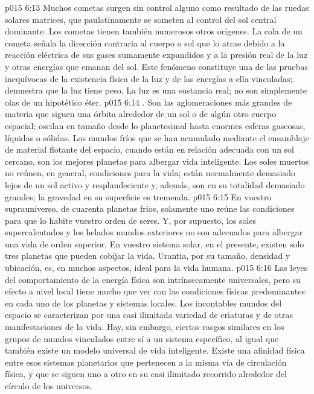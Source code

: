 \vs p015 6:13 Muchos cometas surgen sin control alguno como resultado de las ruedas solares matrices, que paulatinamente se someten al control del sol central dominante. Los cometas tienen también numerosos otros orígenes. La cola de un cometa señala la dirección contraria al cuerpo o sol que lo atrae debido a la reacción eléctrica de sus gases sumamente expandidos y a la presión real de la luz y otras energías que emanan del sol. Este fenómeno constituye una de las pruebas inequívocas de la existencia física de la luz y de las energías a ella vinculadas; demuestra que la luz tiene peso. La luz es una sustancia real; no son simplemente olas de un hipotético éter.
\vs p015 6:14 \pc {}. Son las aglomeraciones más grandes de materia que siguen una órbita alrededor de un sol o de algún otro cuerpo espacial; oscilan en tamaño desde lo planetesimal hasta enormes esferas gaseosas, líquidas o sólidas. Los mundos fríos que se han acumulado mediante el ensamblaje de material flotante del espacio, cuando están en relación adecuada con un sol cercano, son los mejores planetas para albergar vida inteligente. Los soles muertos no reúnen, en general, condiciones para la vida; están normalmente demasiado lejos de un sol activo y resplandeciente y, además, son en su totalidad demasiado grandes; la gravedad en su superficie es tremenda.
\vs p015 6:15 En vuestro suprauniverso, de cuarenta planetas fríos, solamente uno reúne las condiciones para que lo habite vuestro orden de seres. Y, por supuesto, los soles supercalentados y los helados mundos exteriores no son adecuados para albergar una vida de orden superior. En vuestro sistema solar, en el presente, existen solo tres planetas que pueden cobijar la vida. Urantia, por su tamaño, densidad y ubicación, es, en muchos aspectos, ideal para la vida humana.
\vs p015 6:16 Las leyes del comportamiento de la energía física son intrínsecamente universales, pero su efecto a nivel local tiene mucho que ver con las condiciones físicas predominantes en cada uno de los planetas y sistemas locales. Los incontables mundos del espacio se caracterizan por una casi ilimitada variedad de criaturas y de otras manifestaciones de la vida. Hay, sin embargo, ciertos rasgos similares en los grupos de mundos vinculados entre sí a un sistema específico, al igual que también existe un modelo universal de vida inteligente. Existe una afinidad física entre esos sistemas planetarios que pertenecen a la misma vía de circulación física, y que se siguen uno a otro en su casi ilimitado recorrido alrededor del círculo de los universos.
